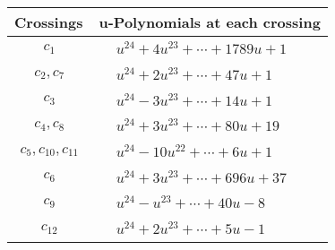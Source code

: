 \documentclass[1p]{elsarticle_modified}
\theoremstyle{definition}
\begin{document}
\begin{tabular}{m{50pt}|m{274pt}}
Crossings & \hspace{64pt}u-Polynomials at each crossing \\
\hline $$\begin{aligned}c_{1}\end{aligned}$$&$\begin{aligned}
&u^{24}+4 u^{23}+\cdots+1789 u+1
\end{aligned}$\\
\hline $$\begin{aligned}c_{2},c_{7}\end{aligned}$$&$\begin{aligned}
&u^{24}+2 u^{23}+\cdots+47 u+1
\end{aligned}$\\
\hline $$\begin{aligned}c_{3}\end{aligned}$$&$\begin{aligned}
&u^{24}-3 u^{23}+\cdots+14 u+1
\end{aligned}$\\
\hline $$\begin{aligned}c_{4},c_{8}\end{aligned}$$&$\begin{aligned}
&u^{24}+3 u^{23}+\cdots+80 u+19
\end{aligned}$\\
\hline $$\begin{aligned}c_{5},c_{10},c_{11}\end{aligned}$$&$\begin{aligned}
&u^{24}-10 u^{22}+\cdots+6 u+1
\end{aligned}$\\
\hline $$\begin{aligned}c_{6}\end{aligned}$$&$\begin{aligned}
&u^{24}+3 u^{23}+\cdots+696 u+37
\end{aligned}$\\
\hline $$\begin{aligned}c_{9}\end{aligned}$$&$\begin{aligned}
&u^{24}- u^{23}+\cdots+40 u-8
\end{aligned}$\\
\hline $$\begin{aligned}c_{12}\end{aligned}$$&$\begin{aligned}
&u^{24}+2 u^{23}+\cdots+5 u-1
\end{aligned}$\\
\hline
\end{tabular}\\~\\
\end{document}
